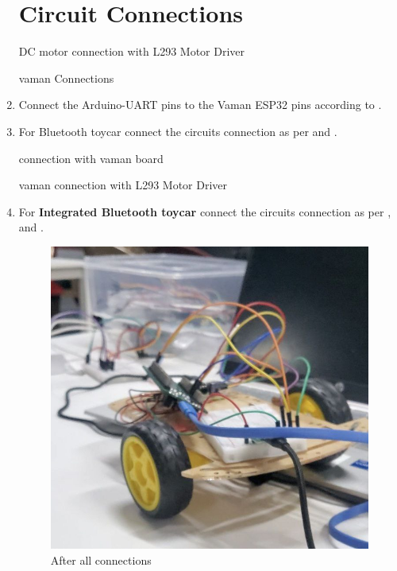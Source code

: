 \begin{enumerate}[label=\thesection.\arabic*.,ref=\thesection.\theenumi]
\section{Circuit Connections}

\begin{table}[!ht]
\centering
	
	\caption{DC motor connection with L293 Motor Driver }
	\label{Tab:dcmotor}
\end{table}

\begin{table}[!ht]
\centering
	
	\caption{ vaman Connections}
	\label{Tab:connections3}
\end{table}
\item Connect the Arduino-UART pins to the Vaman ESP32 pins according to .
\item For Bluetooth toycar connect the circuits connection as per  and  .
\begin{table}[!ht]
\centering
	
	\caption{connection with vaman board }
	\label{Tab:connections}
\end{table}
\begin{table}[!ht]
\centering
	
	\caption{vaman connection with L293 Motor Driver}
	\label{Tab:connections2}
\end{table}
\item For \textbf{Integrated Bluetooth toycar} connect the circuits connection
as per  ,  and
.

\begin{figure}[!ht]
\centering
\includegraphics[width=0.3\columnwidth]{ugv/figs/8.jpg}
\caption{After all connections}
\end{figure}


\end{enumerate}

